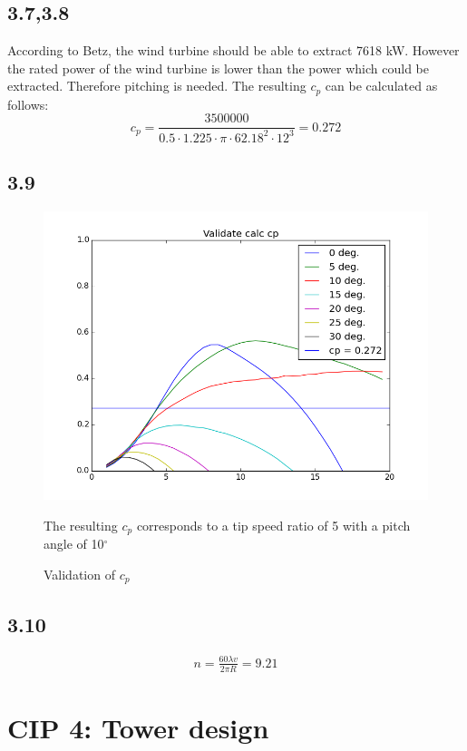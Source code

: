 \documentclass[10pt]{article}
\begin{document}
\subsection{3.7,3.8}
According to Betz, the wind turbine should be able to extract 7618 kW.
However the rated power of the wind turbine is lower than the power which could be extracted. Therefore pitching is needed. The resulting $c_p$ can be calculated as follows:
\begin{equation}
c_p = \frac{3500000}{0.5 \cdot 1.225 \cdot \pi\cdot  62.18^2 \cdot  12^3} = 0.272
\end{equation}
\subsection{3.9}
\begin{figure}[H]
\centering
\includegraphics[width=1\linewidth]{../CIP_3/WT_Perf/Output/validated_cp.png}
\caption{Validation of $c_p$}
\label{fig:validate}
The resulting $c_p$ corresponds to a tip speed ratio of 5 with a pitch angle of 10$^\circ$
\end{figure} 
\subsection{3.10}
\begin{align*}
n = \frac{60 \lambda v}{2 \pi R} = 9.21
\end{align*}
\newpage
\section{CIP 4: Tower design}
\end{document}
